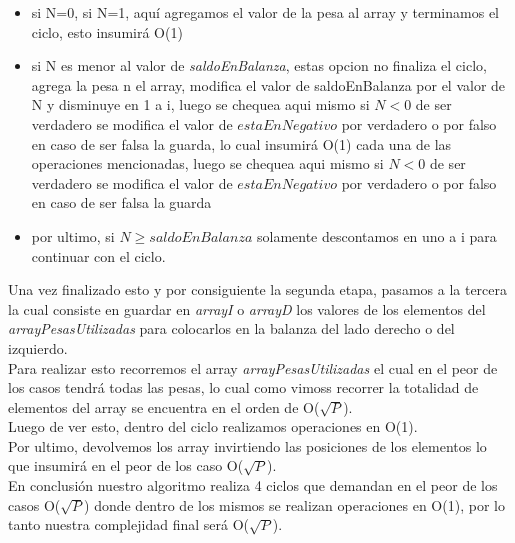 \begin{itemize}
\item si N=0, si N=1, aqu\'i agregamos el valor de la pesa al array y terminamos el ciclo, esto insumir\'a O(1)
 \item si N es menor al valor de \textit{saldoEnBalanza}, estas opcion no finaliza el ciclo,
 agrega la pesa n el array, modifica el valor de saldoEnBalanza por el valor de N y disminuye en 1 a i, luego se chequea aqui mismo si $N < 0$ de ser verdadero se modifica el valor de $estaEnNegativo$ por verdadero o por falso en caso de ser falsa la guarda, lo cual insumir\'a O(1) cada una de las operaciones mencionadas, luego se chequea aqui mismo si $N < 0$ de ser verdadero se modifica el valor de $estaEnNegativo$ por verdadero o por falso en caso de ser falsa la guarda
 \item por ultimo, si $N \geq saldoEnBalanza$ solamente descontamos en uno a i para continuar con el ciclo.
\end{itemize} 
Una vez finalizado esto y por consiguiente la segunda etapa, pasamos a la tercera la cual consiste en guardar en \textit{arrayI} o \textit{arrayD} los valores de los elementos del \textit{arrayPesasUtilizadas} para colocarlos en la balanza del lado derecho o del izquierdo.\\
Para realizar esto recorremos el array \textit{arrayPesasUtilizadas} el cual en el peor de los casos tendr\'a todas las pesas, lo cual como vimoss recorrer la totalidad de elementos del array se encuentra en el orden de O($\sqrt{P}$).\\

Luego de ver esto, dentro del ciclo realizamos operaciones en O(1).\\
Por ultimo, devolvemos los array invirtiendo las posiciones de los elementos lo que insumir\'a en el peor de los caso O($\sqrt{P}$).\\

En conclusi\'on nuestro algoritmo realiza 4 ciclos que demandan en el peor de los casos O($\sqrt{P}$) donde dentro de los mismos se realizan operaciones en O(1), por lo tanto nuestra complejidad final ser\'a
O($\sqrt{P}$).




